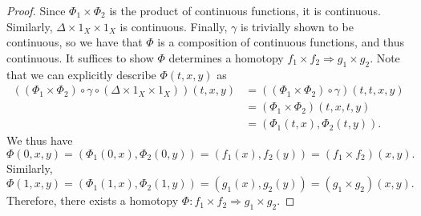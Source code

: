 \documentclass[11pt, letterpaper]{article}
\begin{document}
\begin{proof}
	Since $\Phi _1\times \Phi _2$ is the product of continuous functions, it is continuous. Similarly, $\Delta \times 1_X\times 1_X$ is continuous. Finally, $\gamma $ is trivially shown to be continuous, so we have that $\Phi $ is a composition of continuous functions, and thus continuous. It suffices to show $\Phi $ determines a homotopy $f_1\times f_2\Rightarrow g_1\times g_2$. Note that we can explicitly describe $\Phi(t,x,y) $ as
	\begin{align*}
		\left( \left( \Phi _1\times \Phi _2 \right) \circ \gamma \circ \left( \Delta \times 1_X\times 1_X \right)  \right) (t,x,y)&=\left( \left( \Phi _1\times \Phi _2 \right) \circ \gamma  \right) (t,t,x,y)\\
																	  &=\left( \Phi _1\times \Phi _2 \right) (t,x,t,y)\\
																	  &=(\Phi _1(t,x),\Phi _2(t,y))
	.\end{align*}
	We thus have
	\[
		\Phi (0,x,y)=\left( \Phi _1(0,x),\Phi _2(0,y) \right) =(f_1(x),f_2(y))=(f_1\times f_2)(x,y)
	.\]
	Similarly,
	\[
		\Phi (1,x,y)=\left( \Phi _1(1,x),\Phi _2(1,y) \right) =\left( g_1(x),g_2(y) \right) =\left( g_1\times g_2 \right) (x,y)
	.\]
	Therefore, there exists a homotopy $\Phi : f_1\times f_2 \Rightarrow g_1\times g_2$.
\end{proof}
\end{document}
